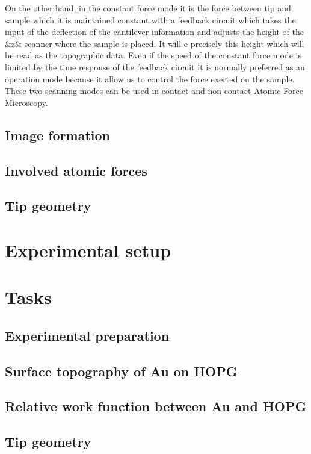 \documentclass{article}
\begin{document}
On the other hand, in the constant force mode it is the force between tip and sample which it is maintained constant with a feedback circuit which takes the input of the deflection of the cantilever information and adjusts the height of the &z& scanner where the sample is placed. It will e precisely this height which will be read as the topographic data. Even if the speed of the constant force mode is limited by the time response of the feedback circuit it is normally preferred as an operation mode because it allow us to control the force exerted on the sample. These two scanning modes can be used in contact and non-contact Atomic Force Microscopy.



\subsection{Image formation}
\clearpage
\subsection{Involved atomic forces}

\subsection{Tip geometry}

\section{Experimental setup}

\section{Tasks}

\subsection{Experimental preparation}

\subsection{Surface topography of Au on HOPG}

\subsection{Relative work function between Au and HOPG}

\subsection{Tip geometry}
\end{document}
